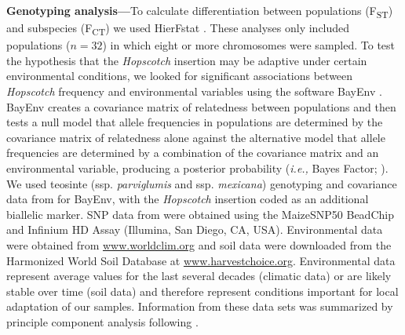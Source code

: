 \documentclass[11pt]{article} %
\begin{document}
\begin{linenumbers}
\begin{flushleft}
\textbf{Genotyping analysis---}To calculate differentiation between populations (F\textsubscript{ST}) and subspecies (F\textsubscript{CT}) we used HierFstat \citep{Goudet2005}. These analyses only included populations ($n = 32$) in which eight or more chromosomes were sampled. To test the hypothesis that the \emph{Hopscotch} insertion may be adaptive under certain environmental conditions, we looked for significant associations between \emph{Hopscotch} frequency and environmental variables using the software BayEnv \citep{Coop2010}. BayEnv creates a covariance matrix of relatedness between populations and then tests a null model that allele frequencies in populations are determined by the covariance matrix of relatedness alone against the alternative model that allele frequencies are determined by a combination of the covariance matrix and an environmental variable, producing a posterior probability (\emph{i.e.,} Bayes Factor; \citealt{Coop2010}). We used teosinte (ssp. \emph{parviglumis} and ssp. \emph{mexicana}) genotyping and covariance data from \citet{Pyhajarvi2013} for BayEnv, with the \emph{Hopscotch} insertion coded as an additional biallelic marker. SNP data from \citet{Pyhajarvi2013} were obtained using the MaizeSNP50 BeadChip and Infinium HD Assay (Illumina, San Diego, CA, USA). Environmental data were obtained from \url{www.worldclim.org} and soil data were downloaded from the Harmonized World Soil Database \citep{FAOHWSD} at \url{www.harvestchoice.org}.  Environmental data represent average values for the last several decades (climatic data) or are likely stable over time (soil data) and therefore represent conditions important for local adaptation of our samples.  Information from these data sets was summarized by principle component analysis following \citet{Pyhajarvi2013}.


\end{flushleft}
\end{linenumbers}
\end{document}
